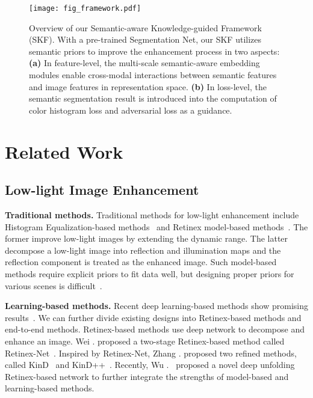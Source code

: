 \documentclass[10pt,twocolumn,letterpaper]{article}
\begin{document}
\begin{figure*}[ht]
  \centering
   \texttt{[image: fig\_framework.pdf]}
   \setlength{\abovecaptionskip}{-0.3cm}
   \setlength{\belowcaptionskip}{-0.6cm}
   \caption{Overview of our Semantic-aware Knowledge-guided Framework (SKF). With a pre-trained Segmentation Net, our SKF utilizes semantic priors to improve the enhancement process in two aspects: \textbf{(a)} In feature-level, the multi-scale semantic-aware embedding modules enable cross-modal interactions between semantic features and image features in representation space. \textbf{(b)} In loss-level, the semantic segmentation result is introduced into the computation of color histogram loss and adversarial loss as a guidance.}
   \label{fig:framwork}
\end{figure*}

\vspace{-0.5cm}
\section{Related Work}
\label{sec:related}
\vspace{-0.1cm}
\subsection{Low-light Image Enhancement}
\vspace{-0.05cm}
\textbf{Traditional methods.} Traditional methods for low-light enhancement include Histogram Equalization-based methods~\cite{abdullah2007histogramequal} and Retinex model-based methods~\cite{jobson1997retinex}. The former improve low-light images by extending the dynamic range. The latter decompose a low-light image into reflection and illumination maps and the reflection component is treated as the enhanced image. Such model-based methods require explicit priors to fit data well, but designing proper priors for various scenes is difficult~\cite{wu2022uretinexnet}.

\textbf{Learning-based methods.} Recent deep learning-based methods show promising results~\cite{Chen2018Retinex, zhao2021retinexdip, zhang2019kind, zhang2021kindplus, wu2022uretinexnet, liu2021ruas, jiang2022drgn}. We can further divide existing designs into Retinex-based methods and end-to-end methods. Retinex-based methods use deep network to decompose and enhance an image. Wei \etal. proposed a two-stage Retinex-based method called Retinex-Net~\cite{Chen2018Retinex}. Inspired by Retinex-Net, Zhang \etal. proposed two refined methods, called KinD~\cite{zhang2019kind} and KinD++~\cite{zhang2021kindplus}. Recently, Wu \etal.~\cite{wu2022uretinexnet} proposed a novel deep unfolding Retinex-based network to further integrate the strengths of model-based and learning-based methods.
\end{document}
